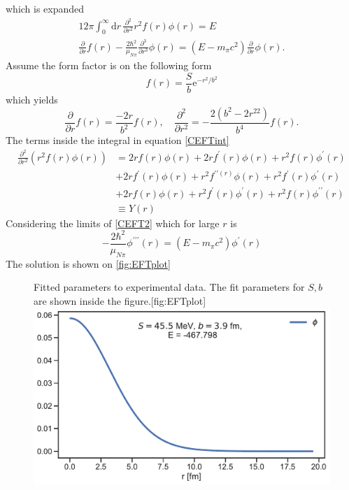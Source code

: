 which is expanded
\begin{align}\label{CEFTint}
	12\pi \int_0^\infty \text{d}r \, \frac{\partial^2}{\partial r^2}r^2f(r)\phi(r) =E \\
	\frac{\partial}{\partial r}f(r)-\frac{2\hbar^2}{\mu_{N\pi}} \frac{\partial^3}{\partial r^3}\phi(r) = (E-m_\pi c^2)\frac{\partial}{\partial r}\phi(r)\label{CEFT2}.
\end{align}
Assume the form factor is on the following form
\begin{equation}
	f(r) = \frac{S}{b}\text{e}^{-r^2/b^2}
\end{equation}
which yields
\begin{equation}
	\frac{\partial}{\partial r} f(r) = \frac{-2r}{b^2}f(r), \quad \frac{\partial^2}{\partial r^2}=-\frac{2(b^2-2r^22)}{b^4}f(r).
\end{equation}
The terms inside the integral in equation \eqref{CEFTint} 
\begin{align}
	\frac{\partial^2}{\partial r^2}(r^2f(r)\phi(r)) & = 2rf(r)\phi(r)+2rf^\prime(r)\phi(r)+r^2f(r)\phi ^\prime(r)
	\\&+2rf^\prime(r)\phi(r)+r^2f^{\prime\prime(r)}\phi(r)+r^2f^\prime(r)\phi^\prime(r)\\
	&+2rf(r)\phi(r)+r^2f^\prime(r)\phi^\prime (r)+r^2f(r)\phi^{\prime\prime}(r) \\&\equiv Y(r)
\end{align}
Considering the limits of \eqref{CEFT2} which for large $r$ is
\begin{equation}
	-\frac{2\hbar^2}{\mu_{N\pi}}\phi^{\prime\prime\prime}(r) =(E-m_\pi c^2)\phi^\prime(r)
\end{equation}
The solution is shown on \ref{fig:EFTplot}
\begin{figure}[H]
	\begin{sidecaption}{Fitted parameters to experimental data. The fit parameters for $S,b$ are shown inside the figure.}[fig:EFTplot]
		\includegraphics[width=\linewidth]{Figures/EFToperator.pdf}
	\end{sidecaption}
\end{figure}

